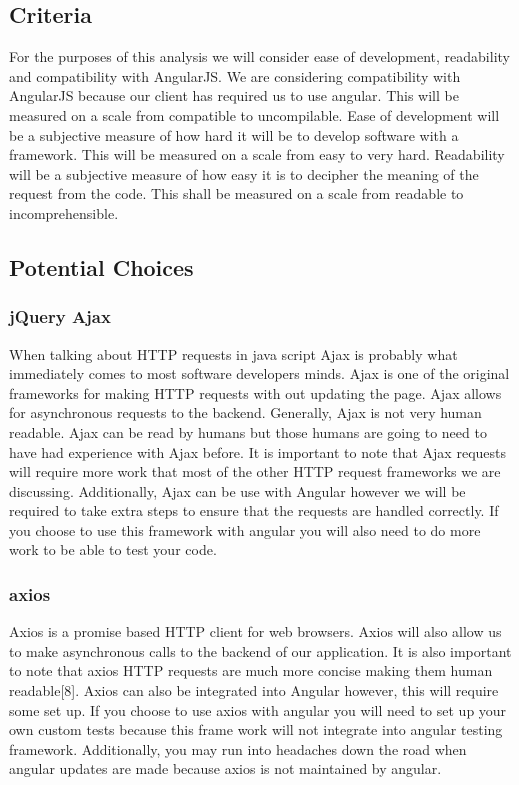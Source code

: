 \documentclass[onecolumn, draftclsnofoot,10pt, compsoc]{article}
\begin{document}
	\subsection{Criteria}
		For the purposes of this analysis we will consider ease of development, readability and compatibility with AngularJS. We are considering compatibility with AngularJS because our client has required us to use angular. This will be measured on a scale from compatible to uncompilable. Ease of development will be a subjective measure of how hard it will be to develop software with a framework. This will be measured on a scale from easy to very hard. Readability will be a subjective measure of how easy it is to decipher the meaning of the request from the code. This shall be measured on a scale from readable to incomprehensible.\\
	\subsection{Potential Choices}
		\subsubsection{jQuery Ajax}
			When talking about HTTP requests in java script Ajax is probably what immediately comes to most software developers minds. Ajax is one of the original frameworks for making HTTP requests with out updating the page. Ajax allows for asynchronous requests to the backend. Generally, Ajax is not very human readable. Ajax can be read by humans but those humans are going to need to have had experience with Ajax before. It is important to note that Ajax requests will require more work that most of the other HTTP request frameworks we are discussing. Additionally, Ajax can be use with Angular however we will be required to take extra steps to ensure that the requests are handled correctly. If you choose to use this framework with angular you will also need to do more work to be able to test your code.
		\subsubsection{axios}
			Axios is a promise based HTTP client for web browsers. Axios will also allow us to make asynchronous calls to the backend of our application. It is also important to note that axios HTTP requests are much more concise making them human readable[8]. Axios can also be integrated into Angular however, this will require some set up. If you choose to use axios with angular you will need to set up your own custom tests because this frame work will not integrate into angular testing framework. Additionally, you may run into headaches down the road when angular updates are made because axios is not maintained by angular.
\end{document}
